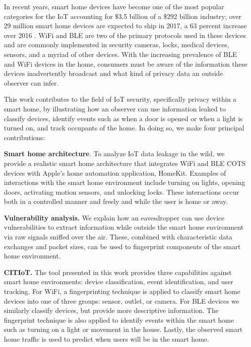 In recent years, smart home devices have become one of the most popular categories for the \ac{IoT} accounting for \$3.5 billion of a \$292 billion industry; over 29 million smart home devices are expected to ship in 2017, a 63 percent increase over 2016 \cite{consumerTech}. WiFi and \ac{BLE} are two of the primary protocols used in these devices and are commonly implemented in security cameras, locks, medical devices, sensors, and a myriad of other devices. With the increasing prevalence of \ac{BLE} and WiFi devices in the home, consumers must be aware of the information these devices inadvertently broadcast and what kind of privacy data an outside observer can infer. 

This work contributes to the field of \ac{IoT} security, specifically privacy within a smart home, by illustrating how an observer can use information leaked to classify devices, identify events such as when a door is opened or when a light is turned on, and track occupants of the home. In doing so, we make four principal contributions:

\textbf{Smart home architecture}. To analyze \ac{IoT} data leakage in the wild, we provide a realistic smart home architecture that integrates WiFi and \ac{BLE} \ac{COTS} devices with Apple's home automation application, HomeKit. Examples of interactions with the smart home environment include turning on lights, opening doors, activating motion sensors, and unlocking locks. These interactions occur both in a controlled manner and freely and while the user is home or away.

\textbf{Vulnerability analysis.} We explain how an eavesdropper can use device vulnerabilities to extract information while outside the smart home environment via raw signals sniffed over the air.  These, combined with characteristic data exchanges and packet sizes, can be used to fingerprint components of the smart home environment.

\textbf{CITIoT.} The tool presented in this work provides three capabilities against smart home environments: device classification, event identification, and user tracking. For WiFi, a fingerprinting technique is applied to classify smart home devices into one of three groups: sensor, outlet, or camera. For \ac{BLE} devices we similarly classify devices, but provide more descriptive information. The fingerprint technique is also applied to identify events within the smart home such as turning on a light or movement in the house. Lastly, the observed smart home traffic is used to predict when users will be in the smart home.

